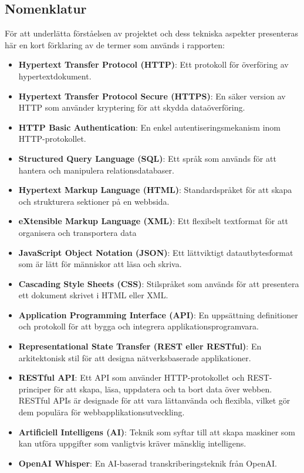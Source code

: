 \subsection{Nomenklatur}
\label{sec:nomenclature}
För att underlätta förståelsen av projektet och dess tekniska aspekter
presenteras här en kort förklaring av de termer som används i rapporten:
\begin{itemize}
    \item \textbf{Hypertext Transfer Protocol (HTTP)}: Ett protokoll för överföring av
    hypertextdokument.
    \item \textbf{Hypertext Transfer Protocol Secure (HTTPS)}: En säker version av HTTP
    som använder kryptering för att skydda dataöverföring.
    \item \textbf{HTTP Basic Authentication}: En enkel autentiseringsmekanism inom
    HTTP-protokollet.
    \item \textbf{Structured Query Language (SQL)}: Ett språk som används för att
    hantera och manipulera relationsdatabaser.
    \item \textbf{Hypertext Markup Language (HTML)}: Standardspråket för att skapa och
    strukturera sektioner på en webbsida.
    \item \textbf{eXtensible Markup Language (XML)}: Ett flexibelt textformat för att
    organisera och transportera data
    \item \textbf{JavaScript Object Notation (JSON)}: Ett lättviktigt datautbytesformat
    som är lätt för människor att läsa och skriva.
    \item \textbf{Cascading Style Sheets (CSS)}: Stilspråket som används för att
    presentera ett dokument skrivet i HTML eller XML.
    \item \textbf{Application Programming Interface (API)}: En uppsättning definitioner
    och protokoll för att bygga och integrera applikationsprogramvara.
    \item \textbf{Representational State Transfer (REST eller RESTful)}: En
    arkitektonisk stil för att designa nätverksbaserade applikationer.
    \item \textbf{RESTful API}: Ett API som använder HTTP-protokollet och REST-principer
    för att skapa, läsa, uppdatera och ta bort data över webben. RESTful APIs
    är designade för att vara lättanvända och flexibla, vilket gör dem populära
    för webbapplikationsutveckling.
    \item \textbf{Artificiell Intelligens (AI)}: Teknik som syftar till att skapa
    maskiner som kan utföra uppgifter som vanligtvis kräver mänsklig
    intelligens.
    \item \textbf{OpenAI Whisper}: En AI-baserad transkriberingsteknik från
    OpenAI.
\end{itemize}

